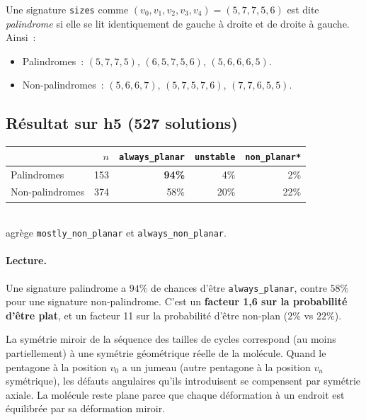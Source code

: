 \documentclass[11pt,a4paper]{article}
\begin{document}
Une signature \texttt{sizes} comme $(v_0, v_1, v_2, v_3, v_4) = (5, 7, 7, 5, 6)$ est dite \emph{palindrome} si elle se lit identiquement de gauche à droite et de droite à gauche. Ainsi~:
\begin{itemize}[leftmargin=2em,itemsep=0.2em]
  \item Palindromes~: $(5,7,7,5)$, $(6,5,7,5,6)$, $(5,6,6,6,5)$.
  \item Non-palindromes~: $(5,6,6,7)$, $(5,7,5,7,6)$, $(7,7,6,5,5)$.
\end{itemize}

\subsection{Résultat sur h5 (527 solutions)}

\begin{center}
\begin{tabular}{@{}lrrrr@{}}
\toprule
 & \textbf{$n$} & \texttt{always\_planar} & \texttt{unstable} & \texttt{non\_planar*} \\
\midrule
Palindromes      & 153 & \textbf{94\%} & 4\%  & 2\%  \\
Non-palindromes  & 374 & 58\%          & 20\% & 22\% \\
\bottomrule
\end{tabular}
\\[0.2cm]
{\small *agrège \texttt{mostly\_non\_planar} et \texttt{always\_non\_planar}.}
\end{center}

\paragraph{Lecture.} Une signature palindrome a $94\%$ de chances d'être \texttt{always\_planar}, contre $58\%$ pour une signature non-palindrome. C'est un \textbf{facteur 1,6 sur la probabilité d'être plat}, et un facteur 11 sur la probabilité d'être non-plan ($2\%$ vs $22\%$).

\begin{hypothese}
La symétrie miroir de la séquence des tailles de cycles correspond (au moins partiellement) à une symétrie géométrique réelle de la molécule. Quand le pentagone à la position $v_0$ a un \og jumeau \fg{} (autre pentagone à la position $v_n$ symétrique), les défauts angulaires qu'ils introduisent se compensent par symétrie axiale. La molécule reste plane parce que chaque déformation à un endroit est équilibrée par sa déformation miroir.
\end{hypothese}
\end{document}
